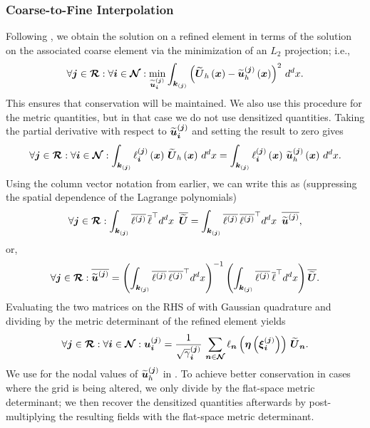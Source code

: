 \subsubsection{Coarse-to-Fine Interpolation}

Following \citet{sbc2015}, we obtain the solution on a refined element
in terms of the solution on the associated coarse element
via the minimization of an $L_{2}$ projection; i.e.,
\begin{equation}
  \forall\boldsymbol{j}\in\boldsymbol{\mathcal{R}}:\forall\boldsymbol{i}\in\boldsymbol{\mathcal{N}}:
  \min\limits_{\widetilde{\boldsymbol{u}}^{\left(\boldsymbol{j}\right)}_{\boldsymbol{i}}}
  \int_{\boldsymbol{k}_{\left(\boldsymbol{j}\right)}}
  \left(\widetilde{\boldsymbol{U}}_{h}\left(\boldsymbol{x}\right)
  -\widetilde{\boldsymbol{u}}_{h}^{\left(\boldsymbol{j}\right)}\left(\boldsymbol{x}\right)\right)^{2}\,
  d^{d}x.
\end{equation}
This ensures that conservation will be maintained.
We also use this procedure for the metric quantities, but in that case we
do not use densitized quantities.
Taking the partial derivative with respect to
$\widetilde{\boldsymbol{u}}_{\boldsymbol{i}}^{\left(\boldsymbol{j}\right)}$ and setting the result to zero
gives
\begin{equation}
  \forall\bs{j}\in\bc{R}:\forall\bs{i}\in\bc{N}:
  \int_{\bs{k}_{\bj}}
  \ell_{\bs{i}}^{\bj}\left(\bs{x}\right)\,
  \wt{\bs{U}}_{h}\left(\bs{x}\right)\,d^{d}x
  =\int_{\bs{k}_{\bj}}
  \ell_{\bs{i}}^{\bj}\left(\bs{x}\right)\,
  \wt{\bs{u}}_{h}^{\bj}\left(\bs{x}\right)\,d^{d}x.
  \label{eq.refine}
\end{equation}
Using the column vector notation from earlier, we can write this as
(suppressing the spatial dependence of the Lagrange polynomials)
\begin{equation}
  \forall\boldsymbol{j}\in\boldsymbol{\mathcal{R}}:
  \int_{\boldsymbol{k}_{\left(\boldsymbol{j}\right)}}
  \overline{\ell^{\left(\boldsymbol{j}\right)}}\,
  \overline{\ell}^{\top} d^{d}x\hspace{0.5em}
  \overline{\widetilde{\boldsymbol{U}}}
  =\int_{\boldsymbol{k}_{\left(\boldsymbol{j}\right)}}
  \overline{\ell^{\left(\boldsymbol{j}\right)}}\,
  \overline{\ell^{\left(\boldsymbol{j}\right)}}^{\top} d^{d}x\hspace{0.5em}
  \overline{\widetilde{\boldsymbol{u}}^{\left(\boldsymbol{j}\right)}},
\end{equation}
or,
\begin{equation}
  \forall\boldsymbol{j}\in\boldsymbol{\mathcal{R}}:
  \overline{\widetilde{\boldsymbol{u}}^{\left(\boldsymbol{j}\right)}}
  =\left(\int_{\boldsymbol{k}_{\left(\boldsymbol{j}\right)}}
  \overline{\ell^{\left(\boldsymbol{j}\right)}}\,
  \overline{\ell^{\left(\boldsymbol{j}\right)}}^{\top} d^{d}x\right)^{-1}
  \left(\int_{\boldsymbol{k}_{\left(\boldsymbol{j}\right)}}
  \overline{\ell^{\left(\boldsymbol{j}\right)}}\,
  \overline{\ell}^{\top} d^{d}x\right)
  \overline{\widetilde{\boldsymbol{U}}}.\label{eq.ref1}
\end{equation}
Evaluating the two matrices on the RHS of 
with Gaussian quadrature
and dividing by the metric determinant of the refined element yields
\begin{equation}
  \forall\bs{j}\in\bc{R}:\forall\bs{i}\in\bc{N}:
  \bs{u}_{\bs{i}}^{\bj}
  =\frac{1}{\sqrt{\gamma}_{\bs{i}}^{\bj}}\,
  \sum\limits_{\bs{n}\in\bc{N}}
  \ell_{\bs{n}}\left(\bs{\eta}\left(\bs{\xi}_{\bs{i}}^{\bj}\right)\right)\,
  \wt{\bs{U}}_{\bs{n}}.
  \label{eq.refNodal}
\end{equation}
We use  for the nodal values of
$\widetilde{\boldsymbol{u}}^{\left(\boldsymbol{j}\right)}_{h}$ in .
To achieve better conservation in cases where the grid is being altered,
we only divide  by the flat-space metric determinant;
we then recover the densitized quantities afterwards by post-multiplying
the resulting fields with the flat-space metric determinant.


